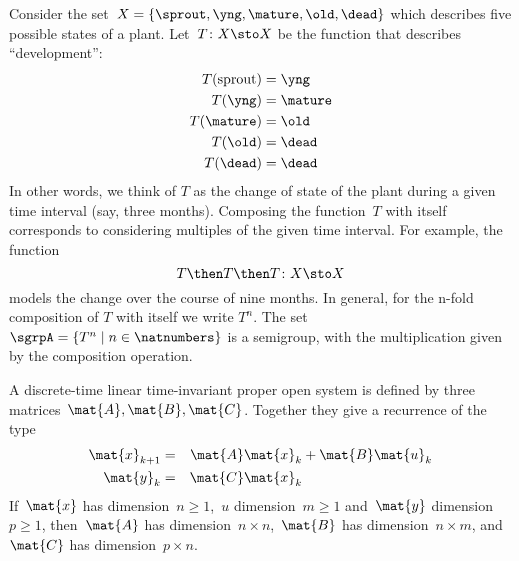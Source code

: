 \begin{example}
  \label{plant-trafo-semigroup}
  Consider the set~$X = \{ \sprout, \yng, \mature, \old, \dead \}$ which describes five possible states of a plant. Let~$T \colon X \sto X$ be the function that describes ``development'':
  \begin{align*}
    T(\text{sprout}) &=  \yng \\
    T(\yng) &=  \mature \\
    T(\mature) &=  \old \\
    T( \old) &= \dead \\
    T (\dead) &= \dead
  \end{align*}
  In other words, we think of $T$ as the change of state of the plant during a given time interval (say, three months).
  Composing the function~$T$ with itself corresponds to considering multiples of the given time interval. For example, the function
  \begin{equation*}
    T \then T \then T \colon X \sto X
  \end{equation*}
  models the change over the course of nine months. In general, for the n-fold composition of $T$ with itself we write $T^n$.
  The set~$\sgrpA = \{ T^n \mid n \in \natnumbers \}$ is a semigroup, with the multiplication given by the composition operation.
\end{example}

 \label{ex:discrete-time-linear}
  \begin{definition}
    \label{def:dicrete-time-linear-system}
    A discrete-time linear time-invariant proper open system is defined by three matrices~$\mat{A},\mat{B},\mat{C}$.
    Together they give a recurrence of the type
    \begin{equation} \label{eq:discrete-time-dynamics}
      \begin{aligned}
        \mat{x}_{k+1} &=& \mat{A} \mat{x}_k & + \mat{B} \mat{u}_k \\
        \mat{y}_{k}   &=& \mat{C} \mat{x}_k  \\
      \end{aligned}
    \end{equation}
    If~$\mat{x}$ has dimension~$n\geq1$,~$u$ dimension~$m\geq1$ and~$\mat{y}$ dimension~$p\geq1$, then~$\mat{A}$ has dimension~$n \times n$,~$\mat{B}$ has dimension~$n \times m$, and~$\mat{C}$ has dimension~$p \times n$.
  \end{definition}

